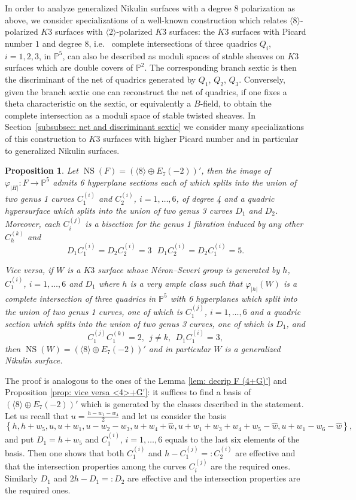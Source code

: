 \documentclass{amsart}
\newtheorem{prop}[thm]{Proposition}
\theoremstyle{definition}
\numberwithin{equation}{section}
\numberwithin{equation}{section} \theoremstyle{definition}
\DeclareMathOperator{\NS}{NS}
\newcommand{\ra}{\rightarrow}
\begin{document}
In order to analyze generalized Nikulin surfaces with a degree $8$ polarization as above, we
consider specializations of a well-known construction which relates $\langle
8\rangle$-polarized $K3$ surfaces with $\langle 2\rangle$-polarized $K3$ surfaces:
the $K3$ surfaces with Picard number $1$ and degree $8$, i.e.~ complete intersections
of three quadrics $Q_i$, $i=1,2,3$, in $\mathbb{P}^5$, can also be described as
moduli spaces of stable sheaves on $K3$ surfaces which are double covers of $\mathbb{P}^2$.
The corresponding branch sextic is then the discriminant of the net of quadrics
generated by $Q_1$, $Q_2$, $Q_3$. Conversely, given the branch sextic one can
reconstruct the net of quadrics, if one fixes a theta characteristic on the sextic,
or equivalently a $B$-field, to obtain the complete intersection as a moduli space of stable twisted sheaves. In Section~\ref{subsubsec: net and discriminant sextic} we consider many specializations of this construction to $K3$ surfaces with higher Picard number and in particular to generalized Nikulin surfaces. 

\begin{prop}\label{prop: alternative description 8+G'}
Let $\NS(F)=\left(\langle 8\rangle\oplus E_7(-2)\right)'$, then the image of $\varphi_{|H|}:F\ra\mathbb{P}^5$ admits 6 hyperplane sections each of which splits into the union of two genus 1 curves $C_1^{(i)}$ and $C_2^{(i)}$, $i=1,\ldots, 6$, of degree 4 and a quadric hypersurface which splits into the union of two genus 3 curves $D_1$ and $D_2$. Moreover, each $C_i^{(j)}$ is a bisection for the genus 1 fibration induced by any other $C_h^{(k)}$ and  $$D_1C_1^{(i)}=D_2C_2^{(i)}=3\ \ \ D_1C_2^{(i)}=D_2C_1^{(i)}=5.$$

Vice versa, if $W$ is a $K3$ surface whose N\'eron--Severi group is generated by $h$, $C_1^{(i)}$, $i=1,\ldots,6 $ and $D_1$ where $h$ is a very ample class such that  $\varphi_{|h|}(W)$ is a complete intersection of three quadrics in $\mathbb{P}^5$ with 6 hyperplanes which split into the union of two genus 1 curves, one of which is $C_1^{(j)}$, $i=1,\ldots,6$ and a quadric section which splits into the union of  two genus 3 curves, one of which is $D_1$, and $$C_{1}^{(j)}C_1^{(k)}=2,\ \ j\neq k,\ \ D_1C_1^{(i)}=3,$$ then $\NS(W)=\left(\langle 8\rangle\oplus E_7(-2)\right)'$ and in particular $W$ is a generalized Nikulin surface.
\end{prop}
\proof The proof is analogous to the ones of the Lemma \ref{lem: decrip F (4+G)'} and Proposition \ref{prop: vice versa <4>+G'}: it suffices to find a basis of $(\langle 8\rangle\oplus E_7(-2))'$ which is generated by the classes described in the statement. Let us recall that $u=\frac{h-w_1-w_4}{2}$ and let us consider the basis 
$$\left\{h,h+w_5,u, u+w_1,u-w_2-w_3,u+w_4+\hat{w}, u+w_1+w_3+w_4+w_5-\hat{w},u+w_1-w_6-\hat{w}\right\},$$
and put $D_1=h+w_5$ and $C_1^{(i)}$, $i=1,\ldots, 6$ equals to the last six elements of the basis. Then one shows that both $C_1^{(i)}$ and $h-C_1^{(j)}=:C_2^{(i)}$ are effective and that the intersection properties among the curves $C_i^{(j)}$ are the required ones. Similarly $D_1$ and $2h-D_1=:D_2$ are effective and the intersection properties are the required ones.\endproof
\end{document}
